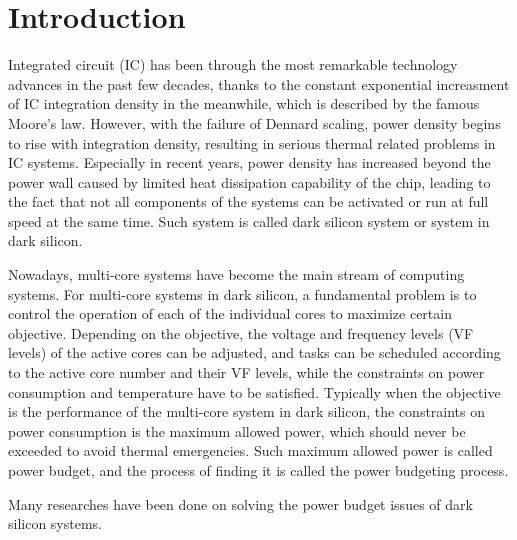 \section{Introduction}

Integrated circuit (IC) has been through the most remarkable technology advances in the past few decades, thanks to the constant exponential increasment of IC integration density in the meanwhile, which is described by the famous Moore's law. However, with the failure of Dennard scaling, power density begins to rise with integration density, resulting in serious thermal related problems in IC systems. Especially in recent years, power density has increased beyond the power wall caused by limited heat dissipation capability of the chip, leading to the fact that not all components of the systems can be activated or run at full speed at the same time. Such system is called dark silicon system or system in dark silicon.

Nowadays, multi-core systems have become the main stream of computing systems. For multi-core systems in dark silicon, a fundamental problem is to control the operation of each of the individual cores to maximize certain objective. Depending on the objective, the voltage and frequency levels (VF levels) of the active cores can be adjusted, and tasks can be scheduled according to the active core number and their VF levels, while the constraints on power consumption and temperature have to be satisfied. Typically when the objective is the performance of the multi-core system in dark silicon, the constraints on power consumption is the maximum allowed power, which should never be exceeded to avoid thermal emergencies. Such maximum allowed power is called power budget, and the process of finding it is called the power budgeting process. 

Many researches have been done on solving the power budget issues of dark silicon systems.

